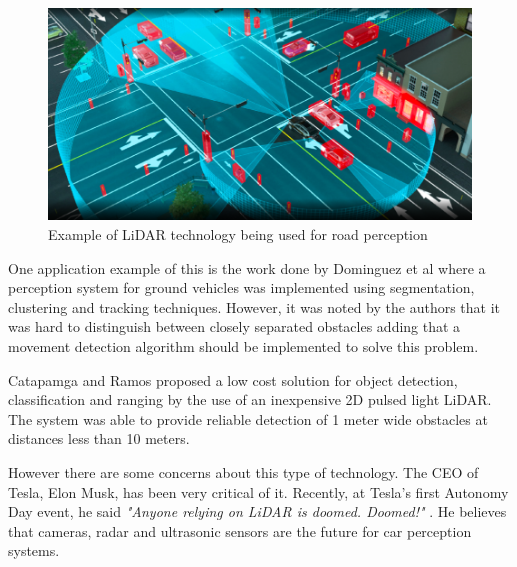 \begin{figure}[ht] 
\centerline{\includegraphics [width=0.7 \textwidth]{imgs/chapter2/lidarcar.png}}
\caption[Example of \ac{LiDAR} technology being used for road perception]{Example of \ac{LiDAR} technology being used for road perception \cite{lidarcar}}
\label{fig:lidarcar}
\end{figure}

One application example of this is the work done by Dominguez et al \cite{lidarperception}  where a perception system for ground vehicles was implemented using segmentation, clustering and tracking techniques.  However, it was noted by the authors that it was hard to distinguish between closely separated obstacles adding that a movement detection algorithm should be implemented to solve this problem. 


Catapamga and Ramos \cite{car2dlidar} proposed  a low cost solution for object detection, classification and ranging by the use of an inexpensive 2D pulsed light \ac{LiDAR}. The system was able to provide reliable detection of 1 meter wide obstacles at distances less than 10 meters.


However there are some concerns about this type of technology. The CEO of Tesla, Elon Musk, has been very critical of it. Recently, at Tesla’s first Autonomy Day event,  he said \textit{"Anyone relying on \ac{LiDAR} is doomed. Doomed!"} \cite{elon}. He believes that cameras, \ac{radar} and ultrasonic sensors are the future for car perception systems. 
